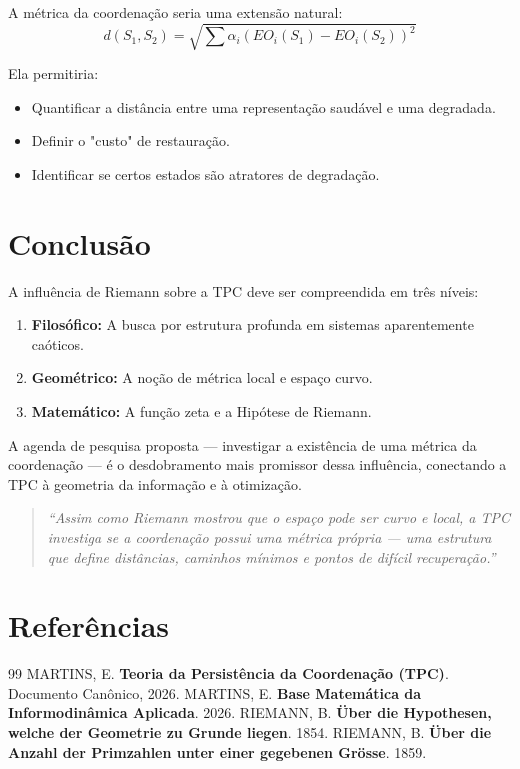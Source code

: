 \documentclass[12pt,a4paper]{article}
\begin{document}
A métrica da coordenação seria uma extensão natural:
\[
d(S_1, S_2) = \sqrt{\sum \alpha_i (EO_i(S_1) - EO_i(S_2))^2}
\]

Ela permitiria:
\begin{itemize}
    \item Quantificar a distância entre uma representação saudável e uma degradada.
    \item Definir o "custo" de restauração.
    \item Identificar se certos estados são atratores de degradação.
\end{itemize}

\section{Conclusão}

A influência de Riemann sobre a TPC deve ser compreendida em três níveis:

\begin{enumerate}
    \item \textbf{Filosófico:} A busca por estrutura profunda em sistemas aparentemente caóticos.
    \item \textbf{Geométrico:} A noção de métrica local e espaço curvo.
    \item \textbf{Matemático:} A função zeta e a Hipótese de Riemann.
\end{enumerate}

A agenda de pesquisa proposta — investigar a existência de uma métrica da coordenação — é o desdobramento mais promissor dessa influência, conectando a TPC à geometria da informação e à otimização.

\begin{quote}
\emph{``Assim como Riemann mostrou que o espaço pode ser curvo e local, a TPC investiga se a coordenação possui uma métrica própria — uma estrutura que define distâncias, caminhos mínimos e pontos de difícil recuperação.''}
\end{quote}

\section*{Referências}

\begin{thebibliography}{99}
 MARTINS, E. \textbf{Teoria da Persistência da Coordenação (TPC)}. Documento Canônico, 2026.
 MARTINS, E. \textbf{Base Matemática da Informodinâmica Aplicada}. 2026.
 RIEMANN, B. \textbf{Über die Hypothesen, welche der Geometrie zu Grunde liegen}. 1854.
 RIEMANN, B. \textbf{Über die Anzahl der Primzahlen unter einer gegebenen Grösse}. 1859.
\end{thebibliography}
\end{document}
